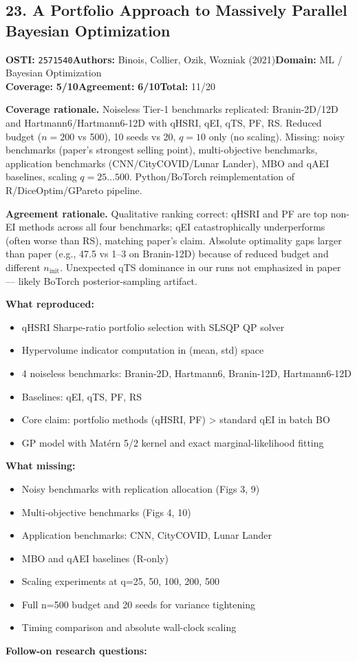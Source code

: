 \documentclass[11pt]{article}
\newcommand{\scorebadge}[2]{\textbf{#1:} \textbf{#2/10}}
\begin{document}
\subsection{23. A Portfolio Approach to Massively Parallel Bayesian Optimization}
\textbf{OSTI:} \texttt{2571540}\quad\textbf{Authors:} Binois, Collier, Ozik, Wozniak (2021)\quad\textbf{Domain:} ML / Bayesian Optimization\\
\scorebadge{Coverage}{5}\quad\scorebadge{Agreement}{6}\quad\textbf{Total:} 11/20\par\smallskip
\noindent\textbf{Coverage rationale.} Noiseless Tier-1 benchmarks replicated: Branin-2D/12D and Hartmann6/Hartmann6-12D with qHSRI, qEI, qTS, PF, RS. Reduced budget ($n=200$ vs 500), 10 seeds vs 20, $q=10$ only (no scaling). Missing: noisy benchmarks (paper's strongest selling point), multi-objective benchmarks, application benchmarks (CNN/CityCOVID/Lunar Lander), MBO and qAEI baselines, scaling $q=25\ldots 500$. Python/BoTorch reimplementation of R/DiceOptim/GPareto pipeline.\par
\noindent\textbf{Agreement rationale.} Qualitative ranking correct: qHSRI and PF are top non-EI methods across all four benchmarks; qEI catastrophically underperforms (often worse than RS), matching paper's claim. Absolute optimality gaps larger than paper (e.g., 47.5 vs 1--3 on Branin-12D) because of reduced budget and different $n_\mathrm{init}$. Unexpected qTS dominance in our runs not emphasized in paper --- likely BoTorch posterior-sampling artifact.\par\smallskip
\noindent\textbf{What reproduced:}
\begin{itemize}[leftmargin=1.4em,itemsep=0.2em,topsep=0.2em]
\item qHSRI Sharpe-ratio portfolio selection with SLSQP QP solver
\item Hypervolume indicator computation in (mean, std) space
\item 4 noiseless benchmarks: Branin-2D, Hartmann6, Branin-12D, Hartmann6-12D
\item Baselines: qEI, qTS, PF, RS
\item Core claim: portfolio methods (qHSRI, PF) \textgreater{} standard qEI in batch BO
\item GP model with Mat\'ern 5/2 kernel and exact marginal-likelihood fitting
\end{itemize}\noindent\textbf{What missing:}
\begin{itemize}[leftmargin=1.4em,itemsep=0.2em,topsep=0.2em]
\item Noisy benchmarks with replication allocation (Figs 3, 9)
\item Multi-objective benchmarks (Figs 4, 10)
\item Application benchmarks: CNN, CityCOVID, Lunar Lander
\item MBO and qAEI baselines (R-only)
\item Scaling experiments at q=25, 50, 100, 200, 500
\item Full n=500 budget and 20 seeds for variance tightening
\item Timing comparison and absolute wall-clock scaling
\end{itemize}\noindent\textbf{Follow-on research questions:}
\end{document}

